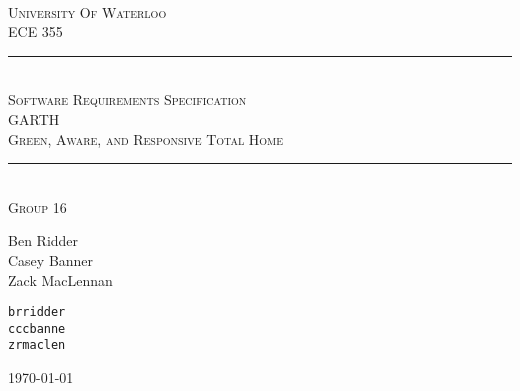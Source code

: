 \begin{titlepage}
\begin{center}
\vfill
\hfill
\\[2cm]
\textsc{\LARGE University Of Waterloo}
\\[1cm]
\textsc{\LARGE ECE 355}
\\[2cm]

\hrule
\hfill
\\[0.5cm]
\textsc{\huge Software Requirements Specification}
\\[0.5cm]
\textsc{\huge GARTH}
\\[0.5cm]
\textsc{\huge Green, Aware, and Responsive Total Home}
\\[0.5cm]
\hrule
\hfill
\\[1cm]
\textsc{\LARGE Group 16} \\[0.4cm]

\begin{minipage}{0.4\textwidth}
\begin{flushleft} \large
Ben Ridder \\
Casey Banner \\
Zack MacLennan
\end{flushleft}
\end{minipage}
\begin{minipage}{0.4\textwidth}
\begin{flushright} \large
\texttt{brridder} \\
\texttt{cccbanne} \\
\texttt{zrmaclen}
\end{flushright}
\end{minipage}


\vfill

{\large \today}
\end{center}
\end{titlepage}
